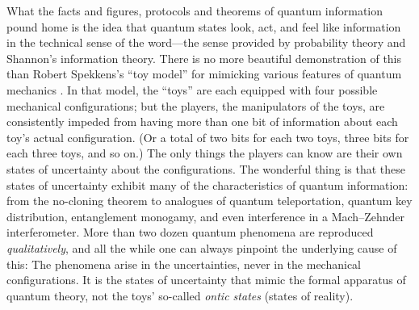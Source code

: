 \documentclass[aps,pra,superscriptaddress,10pt,tightenlines,twocolumn,nofootinbib]{revtex4}
\begin{document}
What the facts and figures, protocols and theorems of quantum information pound home is the idea that quantum states look, act, and feel like information in the technical sense of the word---the sense provided by probability theory and Shannon's information theory.  There is no more beautiful demonstration of this than Robert Spekkens's ``toy model'' for mimicking various features of quantum mechanics \cite{Spekkens07}.  In that model, the ``toys'' are each equipped with four possible mechanical configurations; but the players, the manipulators of the toys, are consistently impeded from having more than one bit of information about each toy's actual configuration. (Or a total of two bits for each two toys, three bits for each three toys, and so on.)  The only things the players can know are their own states of uncertainty about the configurations.  The wonderful thing is that these states of uncertainty exhibit many of the characteristics of quantum information: from the no-cloning theorem to analogues of quantum teleportation, quantum key distribution, entanglement monogamy, and even interference in a Mach--Zehnder interferometer.  More than two dozen quantum phenomena are reproduced {\it qualitatively}, and all the while one can always pinpoint the underlying cause of this:  The phenomena arise in the uncertainties, never in the mechanical configurations.  It is the states of uncertainty that mimic the formal apparatus of quantum theory, not the toys' so-called {\it ontic states\/} (states of reality).
\end{document}
